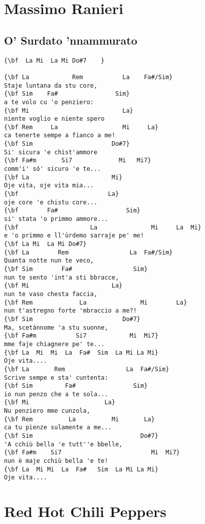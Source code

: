 \documentclass[a4paper]{article}
\begin{document}
\section{Massimo Ranieri} %
\label{sec:Massimo Ranieri}
\subsection{O' Surdato 'nnammurato} %
\label{sub:O' Surdato 'nnammurato}
\begin{Verbatim}[commandchars=\\\{\}]
{\bf  La Mi  La Mi Do#7    }

{\bf La            Rem           La    Fa#/Sim}
Staje luntana da stu core,
{\bf Sim    Fa#                Sim}
a te volo cu 'o penziero:
{\bf Mi                          La}
niente voglio e niente spero
{\bf Rem     La                  Mi     La}
ca tenerte sempe a fianco a me!
{\bf Sim                      Do#7}
Si' sicura 'e chist'ammore
{\bf Fa#m       Si7             Mi   Mi7}
comm'i' só' sicuro 'e te...
{\bf La                       Mi}
Oje vita, oje vita mia...
{\bf                         La}
oje core 'e chistu core...
{\bf        Fa#                   Sim}
si' stata 'o primmo ammore...
{\bf                    La               Mi     La  Mi}
e 'o primmo e ll'ùrdemo sarraje pe' me!
{\bf La Mi  La Mi Do#7}
{\bf La        Rem                 La  Fa#/Sim}
Quanta notte nun te veco,
{\bf Sim        Fa#                 Sim}
nun te sento 'int'a sti bbracce,
{\bf Mi                       La}
nun te vaso chesta faccia,
{\bf Rem             La               Mi        La}
nun t'astregno forte 'mbraccio a me?!
{\bf Sim                         Do#7}
Ma, scetánnome 'a stu suonne,
{\bf Fa#m           Si7            Mi  Mi7}
mme faje chiagnere pe' te...
{\bf La  Mi  Mi  La  Fa#  Sim  La Mi La Mi}
Oje vita....
{\bf La       Rem                 La  Fa#/Sim}
Scrive sempe e sta' cuntenta:
{\bf Sim         Fa#                Sim}
io nun penzo che a te sola...
{\bf Mi                     La}
Nu penziero mme cunzola,
{\bf Rem          La          Mi       La}
ca tu pienze sulamente a me...
{\bf Sim                              Do#7}
'A cchiù bella 'e tutt''e bbelle,
{\bf Fa#m    Si7                         Mi  Mi7}
nun è maje cchiù bella 'e te!
{\bf La  Mi Mi  La  Fa#   Sim  La Mi La Mi}
Oje vita....
\end{Verbatim}
\newpage
\section{Red Hot Chili Peppers} %
\label{sec:Red Hot Chili Peppers}
\end{document}
